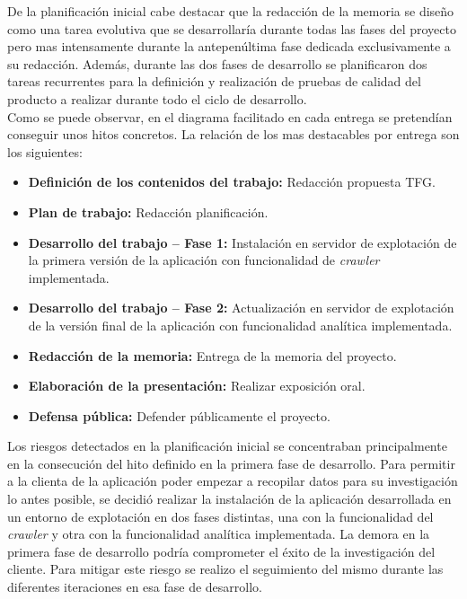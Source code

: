 \documentclass[11pt,a4paper]{article}
\begin{document}
De la planificación inicial cabe destacar que la redacción de la memoria se diseño como una tarea evolutiva que se desarrollaría durante todas las fases del proyecto pero mas intensamente durante la antepenúltima fase dedicada exclusivamente a su redacción. Además, durante las dos fases de desarrollo se  planificaron dos tareas recurrentes para la definición y realización de pruebas de calidad del producto a realizar durante todo el ciclo de desarrollo.
\\

Como se puede observar, en el diagrama facilitado en cada entrega se pretendían conseguir unos hitos concretos. La relación de los mas destacables por entrega son los siguientes:

\begin{itemize}
\item \textbf{Definición de los contenidos del trabajo:} Redacción propuesta TFG.
\item \textbf{Plan de trabajo:} Redacción planificación.
\item \textbf{Desarrollo del trabajo – Fase 1:} Instalación en servidor de explotación de la primera versión de la aplicación con funcionalidad de \textit{crawler} implementada.
\item \textbf{Desarrollo del trabajo – Fase 2:} Actualización en servidor de explotación de la versión final de la aplicación con funcionalidad analítica implementada.
\item \textbf{Redacción de la memoria:} Entrega de la memoria del proyecto.
\item \textbf{Elaboración de la presentación:} Realizar exposición oral.
\item \textbf{Defensa pública:} Defender públicamente el proyecto.
\end{itemize}

Los riesgos detectados en la planificación inicial se concentraban principalmente en la consecución del hito definido en la primera fase de desarrollo. Para permitir a la clienta de la aplicación poder empezar a recopilar datos para su investigación lo antes posible, se decidió realizar la instalación de la aplicación desarrollada en un entorno de explotación en dos fases distintas, una con la funcionalidad del \textit{crawler} y otra con la funcionalidad analítica implementada. La demora en la primera fase de desarrollo podría comprometer el éxito de la investigación del cliente. Para mitigar este riesgo se realizo el seguimiento del mismo durante las diferentes iteraciones en esa fase de desarrollo. 
\\
\end{document}
